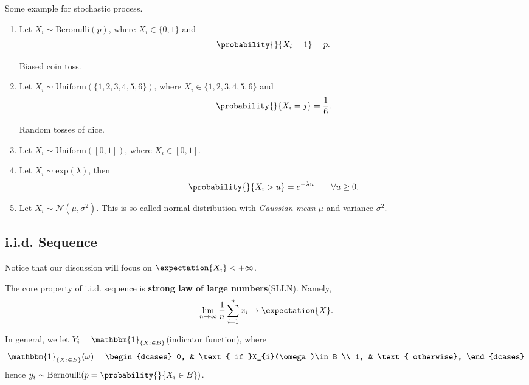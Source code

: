 \begin{eg}
	Some example for stochastic process.
	\begin{enumerate}
		\item Let \(X_i\sim \mathrm{Beronulli}(p)\), where \(X_{i}\in\{0, 1\}\) and
		      \[
			      \probability{}{X_{i} = 1} = p.
		      \]
		      \begin{intuition}
			      Biased coin toss.
		      \end{intuition}
		\item Let \(X_i\sim \mathrm{Uniform}(\{1, 2, 3, 4, 5, 6\})\), where \(X_{i}\in\{1, 2, 3, 4, 5, 6\}\) and
		      \[
			      \probability{}{X_{i} = j} = \frac{1}{6}.
		      \]
		      \begin{intuition}
			      Random tosses of dice.
		      \end{intuition}
		\item Let \(X_i\sim \mathrm{Uniform}(\left[ 0, 1 \right] )\), where \(X_{i}\in\left[ 0, 1 \right] \).
		\item Let \(X_i\sim \mathrm{exp}(\lambda)\), then
		      \[
			      \probability{}{X_{i}>u} = e^{-\lambda u}\qquad \forall u\geq 0.
		      \]
		\item Let \(X_i\sim \mathcal{N}(\mu, \sigma^2)\). This is so-called normal distribution with \emph{Gaussian mean} \(\mu\) and variance \(\sigma^2\).
	\end{enumerate}
\end{eg}

\subsection{i.i.d. Sequence}
\begin{remark}
	Notice that our discussion will focus on \(\expectation{X_i} < +\infty \).
\end{remark}

\begin{note}
	The core property of i.i.d. sequence is \textbf{strong law of large numbers}(SLLN). Namely,
	\[
		\lim_{n \to \infty} \frac{1}{n}\sum\limits_{i=1}^{n} x_{i}\to \expectation{X}.
	\]
\end{note}

In general, we let \(Y_{i} = \mathbbm{1}_{\{X_{i}\in B\}}\)(indicator function), where
\[
	\mathbbm{1}_{\{X_{i}\in B\}}(\omega) = \begin{dcases}
		0, & \text{ if }X_{i}(\omega)\in B \\
		1, & \text{ otherwise},
	\end{dcases}
\]
hence \(y_{i}\sim \mathrm{Bernoulli}(p = \probability{}{X_{i}\in B})\).


